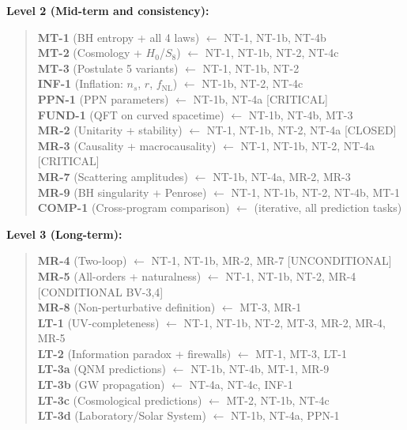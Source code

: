 \documentclass[12pt,a4paper]{article}
\begin{document}
\noindent\textbf{Level 2 (Mid-term and consistency):}
\begin{quote}
  \textbf{MT-1} (BH entropy + all 4 laws) $\longleftarrow$ NT-1, NT-1b, NT-4b \\[2pt]
  \textbf{MT-2} (Cosmology + $H_0$/$S_8$) $\longleftarrow$ NT-1, NT-1b, NT-2, NT-4c \\[2pt]
  \textbf{MT-3} (Postulate 5 variants) $\longleftarrow$ NT-1, NT-1b, NT-2 \\[2pt]
  \textbf{INF-1} (Inflation: $n_s$, $r$, $f_{\text{NL}}$) $\longleftarrow$ NT-1b, NT-2, NT-4c \\[2pt]
  \textbf{PPN-1} (PPN parameters) $\longleftarrow$ NT-1b, NT-4a
    \quad\textcolor{long}{[CRITICAL]} \\[2pt]
  \textbf{FUND-1} (QFT on curved spacetime) $\longleftarrow$ NT-1b, NT-4b, MT-3 \\[2pt]
  \textbf{MR-2} (Unitarity + stability) $\longleftarrow$ NT-1, NT-1b, NT-2, NT-4a
    \quad\textcolor{proven}{[CLOSED]} \\[2pt]
  \textbf{MR-3} (Causality + macrocausality) $\longleftarrow$ NT-1, NT-1b, NT-2, NT-4a
    \quad\textcolor{long}{[CRITICAL]} \\[2pt]
  \textbf{MR-7} (Scattering amplitudes) $\longleftarrow$ NT-1b, NT-4a, MR-2, MR-3 \\[2pt]
  \textbf{MR-9} (BH singularity + Penrose) $\longleftarrow$ NT-1, NT-1b, NT-2, NT-4b, MT-1 \\[2pt]
  \textbf{COMP-1} (Cross-program comparison) $\longleftarrow$ (iterative, all prediction tasks)
\end{quote}

\noindent\textbf{Level 3 (Long-term):}
\begin{quote}
  \textbf{MR-4} (Two-loop) $\longleftarrow$ NT-1, NT-1b, MR-2, MR-7
    \quad\textcolor{proven}{[UNCONDITIONAL]} \\[2pt]
  \textbf{MR-5} (All-orders + naturalness) $\longleftarrow$ NT-1, NT-1b, NT-2, MR-4
    \quad\textcolor{near}{[CONDITIONAL BV-3,4]} \\[2pt]
  \textbf{MR-8} (Non-perturbative definition) $\longleftarrow$ MT-3, MR-1 \\[2pt]
  \textbf{LT-1} (UV-completeness) $\longleftarrow$ NT-1, NT-1b, NT-2, MT-3,
    MR-2, MR-4, MR-5 \\[2pt]
  \textbf{LT-2} (Information paradox + firewalls) $\longleftarrow$ MT-1, MT-3, LT-1 \\[2pt]
  \textbf{LT-3a} (QNM predictions) $\longleftarrow$ NT-1b, NT-4b, MT-1, MR-9 \\[2pt]
  \textbf{LT-3b} (GW propagation) $\longleftarrow$ NT-4a, NT-4c, INF-1 \\[2pt]
  \textbf{LT-3c} (Cosmological predictions) $\longleftarrow$ MT-2, NT-1b, NT-4c \\[2pt]
  \textbf{LT-3d} (Laboratory/Solar System) $\longleftarrow$ NT-1b, NT-4a, PPN-1
\end{quote}
\end{document}

